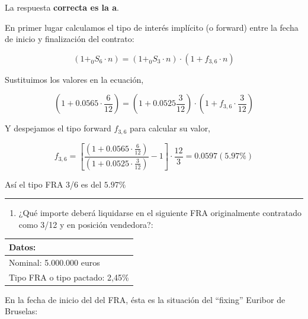 \documentclass[
  letterpaper,
  DIV=11,
  numbers=noendperiod]{scrreprt}
\providecommand{\tightlist}{%
  \setlength{\itemsep}{0pt}\setlength{\parskip}{0pt}}\usepackage{longtable,booktabs,array}
\begin{document}
\begin{tcolorbox}[enhanced jigsaw, left=2mm, opacityback=0, colback=white, breakable, arc=.35mm, bottomrule=.15mm, rightrule=.15mm, toprule=.15mm, leftrule=.75mm, colframe=quarto-callout-tip-color-frame]
\begin{minipage}[t]{5.5mm}
\textcolor{quarto-callout-tip-color}{\faLightbulb}
\end{minipage}%
\begin{minipage}[t]{\textwidth - 5.5mm}

La respuesta \textbf{correcta es la a}.

En primer lugar calculamos el tipo de interés implícito (o forward)
entre la fecha de inicio y finalización del contrato:

\[(1+_{0}S_{6} \cdot {n})=(1+_{0}S_{3} \cdot n)\cdot(1+f_{3,6}\cdot {n})\]

Sustituimos los valores en la ecuación,

\[(1+0.0565\cdot \frac{6}{12})=(1+0.0525\frac{3}{12})\cdot(1+f_{3,6}\cdot \frac{3}{12})\]

Y despejamos el tipo forward \(f_{3,6}\) para calcular su valor,

\[f_{3,6}=\left[\frac{(1+0.0565\cdot \frac{6}{12})}{(1+0.0525\cdot \frac{3}{12})}-1\right]\cdot\frac{ 12}{3 }=0.0597(5.97\%)\]

Así el tipo FRA 3/6 es del \(5.97\%\)

\end{minipage}%
\end{tcolorbox}

\begin{center}\rule{0.5\linewidth}{0.5pt}\end{center}

\begin{enumerate}
\def\labelenumi{\arabic{enumi}.}
\setcounter{enumi}{51}
\tightlist
\item
  ¿Qué importe deberá liquidarse en el siguiente FRA originalmente
  contratado como 3/12 y en posición vendedora?:
\end{enumerate}

\begin{longtable}[]{@{}l@{}}
\toprule()
\textbf{Datos:} \\
\midrule()
\endhead
Nominal: 5.000.000 euros \\
Tipo FRA o tipo pactado: 2,45\% \\
\bottomrule()
\end{longtable}

En la fecha de inicio del del FRA, ésta es la situación del ``fixing''
Euribor de Bruselas:
\end{document}
